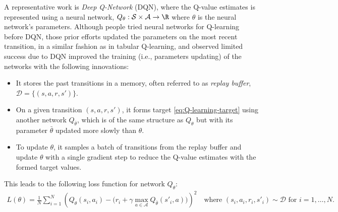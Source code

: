 A representative work is {\em Deep Q-Network} (DQN), where the Q-value estimates is represented using a neural network, $Q_\theta:\mathcal{S}\times\mathcal{A}\to\R$ where $\theta$ is the neural network's parameters.
Although people tried neural networks for Q-learning before DQN, those prior efforts updated the parameters on the most recent transition, in a similar fashion as in tabular Q-learning, and observed limited success due to 
DQN improved the training (i.e., parameters updating) of the networks with the following innovations:
\begin{itemize}
    \item It stores the past transitions in a memory, often referred to as {\em replay buffer}, $\mathcal{D}=\{(s,a,r,s')\}$.
    \item On a given transition $(s,a,r,s')$, it forms target \eqref{eq:Q-learning-target} using another network $Q_{\bar{\theta}}$, which is of the same structure as $Q_{\theta}$ but with its parameter $\bar{\theta}$ updated more slowly than $\theta$.
    \item To update $\theta$, it samples a batch of transitions from the replay buffer and update $\theta$ with a single gradient step to reduce the Q-value estimates with the formed target values.
\end{itemize}
This leads to the following loss function for network $Q_\theta$:
\begin{align*}
    L(\theta) = \frac{1}{N}\sum_{i=1}^{N} \left( Q_\theta(s_i,a_i) - \big(r_i+\gamma \max_{a\in\mathcal{A}} Q_{\bar{\theta}}(s'_i, a)\big) \right)^2
    \quad \text{where }
    (s_i,a_i,r_i,s'_i)\sim\mathcal{D} \text{ for } i=1,\ldots,N.
\end{align*}
